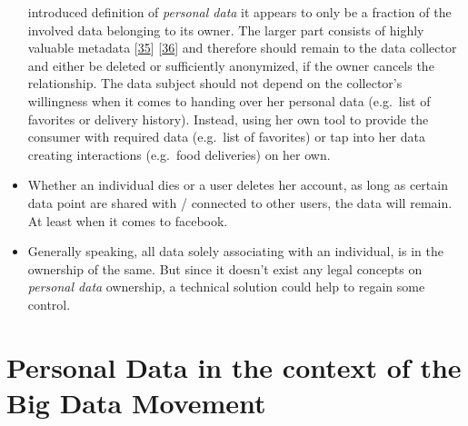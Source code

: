 \documentclass[12pt,english,a4paper,titlepage,cleardoublepage=empty,dottedtoc]{report}
\begin{document}
\begin{itemize}
  introduced definition of \emph{personal data} it appears to only be a
  fraction of the involved data belonging to its owner. The larger part
  consists of highly valuable metadata
  {[}\protect\hyperlink{ref-web_2013_why-metadata-matters}{35}{]}
  {[}\protect\hyperlink{ref-web_2016_why-you-need-metadata-for-big-data-to-success}{36}{]}
  and therefore should remain to the data collector and either be
  deleted or sufficiently anonymized, if the owner cancels the
  relationship. The data subject should not depend on the collector's
  willingness when it comes to handing over her personal data (e.g.~list
  of favorites or delivery history). Instead, using her own tool to
  provide the consumer with required data (e.g.~list of favorites) or
  tap into her data creating interactions (e.g.~food deliveries) on her
  own.
\item
  Whether an individual dies or a user deletes her account, as long as
  certain data point are shared with / connected to other users, the
  data will remain. At least when it comes to facebook.
\item
  Generally speaking, all data solely associating with an individual, is
  in the ownership of the same. But since it doesn't exist any legal
  concepts on \emph{personal data} ownership, a technical solution could
  help to regain some control.
\end{itemize}

\section{Personal Data in the context of the Big Data
Movement}\label{personal-data-in-the-context-of-the-big-data-movement}
\end{document}
